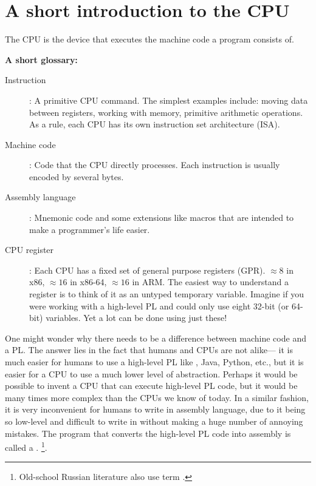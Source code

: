 \section{A short introduction to the CPU}

The \ac{CPU} is the device that executes the machine code a program consists of.

\textbf{A short glossary:}

\begin{description}
\item[Instruction]: A primitive \ac{CPU} command.
The simplest examples include: moving data between registers, working with memory, primitive arithmetic operations.
As a rule, each \ac{CPU} has its own instruction set architecture (\ac{ISA}).

\item[Machine code]: Code that the \ac{CPU} directly processes. 
Each instruction is usually encoded by several bytes.
\item[Assembly language]: Mnemonic code and some extensions like macros that are intended to make a programmer's life easier.
\item[CPU register]: Each \ac{CPU} has a fixed set of general purpose registers (\ac{GPR}).
$\approx 8$ in x86, $\approx 16$ in x86-64, $\approx 16$ in ARM.
The easiest way to understand a register is to think of it as an untyped temporary variable.
Imagine if you were working with a high-level \ac{PL} and could only use eight 32-bit (or 64-bit) variables.
Yet a lot can be done using just these!
\end{description}


One might wonder why there needs to be a difference between machine code and a \ac{PL}.  The answer lies in the fact that humans and \ac{CPU}s are not alike---%
it is much easier for humans to use a high-level \ac{PL} like \CCpp, Java, Python, etc., but it is easier for a \ac{CPU} to use a much lower level of abstraction.
Perhaps it would be possible to invent a \ac{CPU} that can execute high-level \ac{PL} code, but it would be many times more complex than the \ac{CPU}s we know of today.
In a similar fashion, it is very inconvenient for humans to write in assembly language, due to it being so low-level and difficult to write in without making a huge number of annoying mistakes.
The program that converts the high-level \ac{PL} code into assembly is called a .
\footnote{Old-school Russian literature also use term .}.

